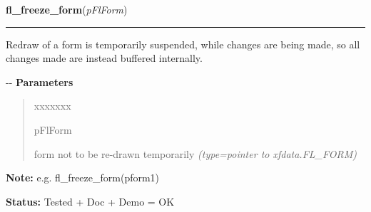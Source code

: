     \label{xformslib:flbasic:fl_freeze_form}

    \vspace{0.5ex}

\hspace{.8\funcindent}\begin{boxedminipage}{\funcwidth}

    \raggedright \textbf{fl\_freeze\_form}(\textit{pFlForm})

    \vspace{-1.5ex}

    \rule{\textwidth}{0.5\fboxrule}
\setlength{\parskip}{2ex}

Redraw of a form is temporarily suspended, while changes are being
made, so all changes made are instead buffered internally.

-{}-
\setlength{\parskip}{1ex}
      \textbf{Parameters}
      \vspace{-1ex}

      \begin{quote}
        \begin{Ventry}{xxxxxxx}

          \item[pFlForm]


form not to be re-drawn temporarily
            {\it (type=pointer to xfdata.FL\_FORM)}

        \end{Ventry}

      \end{quote}

\textbf{Note:} 
e.g. fl\_freeze\_form(pform1)


\textbf{Status:} 
Tested + Doc + Demo = OK


    \end{boxedminipage}

    \label{xformslib:flbasic:fl_set_focus_object}

    \vspace{0.5ex}

